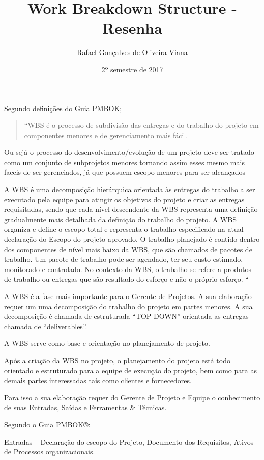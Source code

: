 \documentclass[12pt]{article}
\title{Work Breakdown Structure - Resenha}
\author{Rafael Gonçalves de  Oliveira Viana}
\date{2º semestre de 2017}
\begin{document}
\maketitle
Segundo definições do Guia PMBOK;

 \begin{quote}
“WBS é o processo de subdivisão das entregas e do trabalho do projeto em componentes menores e de gerenciamento mais fácil. 
\end{quote}

Ou sejá o processo  do desenvolvimento/evolução de um projeto deve ser tratado como um conjunto de subprojetos menores tornando assim esses mesmo mais faceis de ser gerenciados, já que possuem escopo menores para ser alcançados





 A WBS é uma decomposição hierárquica orientada às entregas do trabalho a ser executado pela equipe para atingir os objetivos do projeto e criar as entregas requisitadas, sendo que cada nível descendente da WBS representa uma definição gradualmente mais detalhada da definição do trabalho do projeto. A WBS organiza e define o escopo total e representa o trabalho especificado na atual declaração do Escopo do projeto aprovado. O trabalho planejado é contido dentro dos componentes de nível mais baixo da WBS, que são chamados de pacotes de trabalho. Um pacote de trabalho pode ser agendado, ter seu custo estimado, monitorado e controlado. No contexto da WBS, o trabalho se refere a produtos de trabalho ou entregas que são resultado do esforço e não o próprio esforço. “

A WBS é a fase mais importante para o Gerente de Projetos. A sua elaboração requer um uma decomposição do trabalho do projeto em partes menores. A sua decomposição é chamada de estruturada “TOP-DOWN” orientada as entregas chamada de “deliverables”.

A WBS serve como base e orientação no planejamento de projeto.

Após a criação da WBS no projeto, o planejamento do projeto está todo orientado e estruturado para a equipe de execução do projeto, bem como para as demais partes interessadas tais como clientes e fornecedores.

Para isso a sua elaboração requer do Gerente de Projeto e Equipe o conhecimento de suas Entradas, Saídas e Ferramentas \& Técnicas.

Segundo o Guia PMBOK®:

Entradas – Declaração do escopo do Projeto, Documento dos Requisitos, Ativos de Processos organizacionais.
\end{document}
